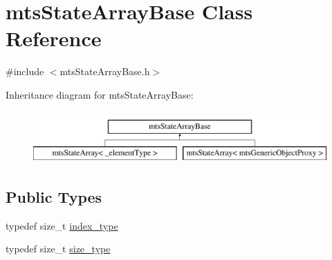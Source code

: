 \hypertarget{classmts_state_array_base}{}\section{mts\+State\+Array\+Base Class Reference}
\label{classmts_state_array_base}


{\ttfamily \#include $<$mts\+State\+Array\+Base.\+h$>$}

Inheritance diagram for mts\+State\+Array\+Base\+:\begin{figure}[H]
\begin{center}
\leavevmode
\includegraphics[height=2.000000cm]{db/d25/classmts_state_array_base}
\end{center}
\end{figure}
\subsection*{Public Types}
\begin{DoxyCompactItemize}
\item 
typedef size\+\_\+t \hyperlink{classmts_state_array_base_a22ecbf65a907a7550951d12970f3df1d}{index\+\_\+type}
\item 
typedef size\+\_\+t \hyperlink{classmts_state_array_base_a2a29f8b24a48620f67c907fc5592fc17}{size\+\_\+type}
\end{DoxyCompactItemize}
